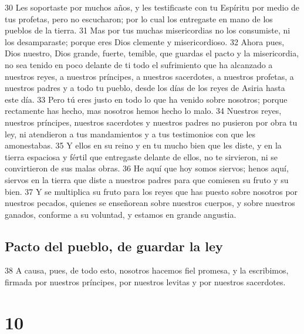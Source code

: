 30 Les soportaste por muchos años, y les testificaste con tu Espíritu por medio de tus profetas, pero no escucharon; por lo cual los entregaste en mano de los pueblos de la tierra. 
31 Mas por tus muchas misericordias no los consumiste, ni los desamparaste; porque eres Dios clemente y misericordioso.
32 Ahora pues, Dios nuestro, Dios grande, fuerte, temible, que guardas el pacto y la misericordia, no sea tenido en poco delante de ti todo el sufrimiento que ha alcanzado a nuestros reyes, a nuestros príncipes, a nuestros sacerdotes, a nuestros profetas, a nuestros padres y a todo tu pueblo, desde los días de los reyes de Asiria hasta este día.
33 Pero tú eres justo en todo lo que ha venido sobre nosotros; porque rectamente has hecho, mas nosotros hemos hecho lo malo.
34 Nuestros reyes, nuestros príncipes, nuestros sacerdotes y nuestros padres no pusieron por obra tu ley, ni atendieron a tus mandamientos y a tus testimonios con que les amonestabas.
35 Y ellos en su reino y en tu mucho bien que les diste, y en la tierra espaciosa y fértil que entregaste delante de ellos, no te sirvieron, ni se convirtieron de sus malas obras.
36 He aquí que hoy somos siervos; henos aquí, siervos en la tierra que diste a nuestros padres para que comiesen su fruto y su bien.
37 Y se multiplica su fruto para los reyes que has puesto sobre nosotros por nuestros pecados, quienes se enseñorean sobre nuestros cuerpos, y sobre nuestros ganados, conforme a su voluntad, y estamos en grande angustia.
\section*{Pacto del pueblo, de guardar la ley}

38 A causa, pues, de todo esto, nosotros hacemos fiel promesa, y la escribimos, firmada por nuestros príncipes, por nuestros levitas y por nuestros sacerdotes.

\chapter{10}


